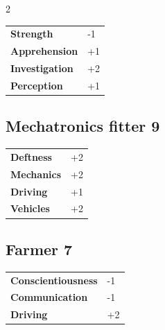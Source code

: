 \begin{multicols}{2}
\begin{tcolorbox}
\begin{tabular}{@{}ll@{}}
    \textbf{Strength} & -1\\
    \textbf{Apprehension} & +1\\
    \textbf{Investigation} & +2\\
    \textbf{Perception} & +1\\
\end{tabular}


\end{tcolorbox}

\begin{tcolorbox}
    \subsection*{Mechatronics fitter \hfill \small{9 }}
    \tcblower




\begin{tabular}{@{}ll@{}}
    \textbf{Deftness} & +2\\
    \textbf{Mechanics} & +2\\
    \textbf{Driving} & +1\\
    \textbf{Vehicles} & +2\\
\end{tabular}


\end{tcolorbox}

\begin{tcolorbox}
    \subsection*{Farmer \hfill \small{7 }}
    \tcblower




\begin{tabular}{@{}ll@{}}
    \textbf{Conscientiousness} & -1\\
    \textbf{Communication} & -1\\
    \textbf{Driving} & +2\\
\end{tabular}


\end{tcolorbox}
\end{multicols}
